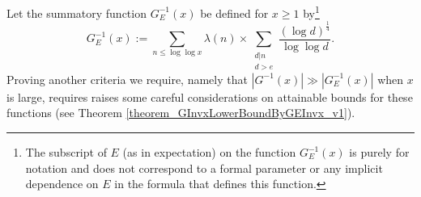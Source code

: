 \documentclass[11pt,reqno,a4letter]{article}
\numberwithin{figure}{section}
\numberwithin{table}{section}
\theoremstyle{plain}
\numberwithin{theorem}{section}
\theoremstyle{definition}
\begin{document}
Let the summatory function $G_E^{-1}(x)$ be defined for $x \geq 1$ by\footnote{ 
     The subscript of $E$ (as in expectation) 
     on the function $G_E^{-1}(x)$ is purely for notation and does not correspond to 
     a formal parameter or any implicit dependence on $E$ in the formula 
     that defines this function. 
}
\begin{equation} 
\label{eqn_GEInvxSummatoryFuncDef_v1} 
G_E^{-1}(x) := \sum_{n \leq \log\log x} \lambda(n) \times 
     \sum_{\substack{d|n \\ d > e}} \frac{(\log d)^{\frac{1}{4}}}{\log\log d}. 
\end{equation} 
Proving another criteria we require, namely that $|G^{-1}(x)| \gg |G_E^{-1}(x)|$ when $x$ is large, 
requires raises some careful considerations on attainable bounds for these functions 
(see Theorem \ref{theorem_GInvxLowerBoundByGEInvx_v1}). 
\end{document}
